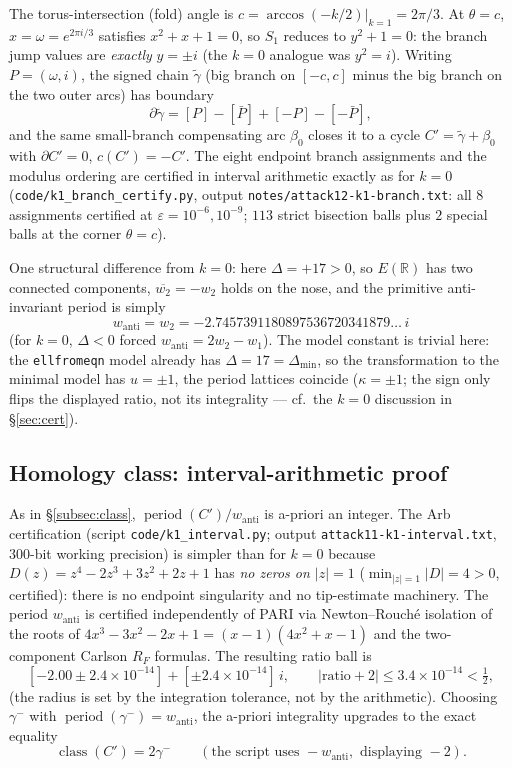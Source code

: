 \documentclass[preprint,12pt]{elsarticle}
\theoremstyle{definition}
\theoremstyle{remark}
\newcommand{\R}{\mathbb{R}}
\DeclareMathOperator{\period}{period}
\DeclareMathOperator{\class}{class}
\begin{document}
The torus-intersection (fold) angle is
$c=\arccos(-k/2)\big|_{k=1}=2\pi/3$. At $\theta=c$, $x=\omega=e^{2\pi i/3}$
satisfies $x^2+x+1=0$, so $S_1$ reduces to $y^2+1=0$: the branch jump values
are \emph{exactly} $y=\pm i$ (the $k=0$ analogue was $y^2=i$). Writing
$P=(\omega,i)$, the signed chain $\tilde\gamma$ (big branch on $[-c,c]$ minus
the big branch on the two outer arcs) has boundary
\[
  \partial\tilde\gamma=[P]-[\bar P]+[-P]-[-\bar P],
\]
and the same
small-branch compensating arc $\beta_0$ closes it to a cycle
$C'=\tilde\gamma+\beta_0$ with $\partial C'=0$, $c(C')=-C'$.
The eight endpoint branch assignments and the modulus ordering are certified
in interval arithmetic exactly as for $k=0$
(\texttt{code/k1\_branch\_certify.py}, output
\texttt{notes/attack12-k1-branch.txt}: all $8$ assignments certified at
$\varepsilon=10^{-6},10^{-9}$; $113$ strict bisection balls plus $2$ special
balls at the corner $\theta=c$).

One structural difference from $k=0$: here $\Delta=+17>0$, so $E(\R)$ has
two connected components, $\overline{w_2}=-w_2$ holds on the nose, and the
primitive anti-invariant period is simply
\[
  w_{\mathrm{anti}}=w_2=-2.7457391180897536720341879\ldots\,i
\]
(for $k=0$, $\Delta<0$ forced $w_{\mathrm{anti}}=2w_2-w_1$).
The model constant is trivial here: the \texttt{ellfromeqn} model already has
$\Delta=17=\Delta_{\min}$, so the transformation to the minimal model has
$u=\pm1$, the period lattices coincide ($\kappa=\pm1$; the sign only flips
the displayed ratio, not its integrality --- cf.\ the $k=0$ discussion in
\S\ref{sec:cert}).

\subsection{Homology class: interval-arithmetic proof}

As in \S\ref{subsec:class}, $\period(C')/w_{\mathrm{anti}}$ is a-priori an
integer. The Arb certification (script \texttt{code/k1\_interval.py};
output \texttt{attack11-k1-interval.txt}, $300$-bit working precision)
is simpler than for $k=0$ because
$D(z)=z^4-2z^3+3z^2+2z+1$ has \emph{no zeros on $|z|=1$}
($\min_{|z|=1}|D|=4>0$, certified): there is no endpoint singularity and no
tip-estimate machinery. The period $w_{\mathrm{anti}}$ is certified
independently of PARI via Newton--Rouch\'e isolation of the roots of
$4x^3-3x^2-2x+1=(x-1)(4x^2+x-1)$ and the two-component Carlson $R_F$
formulas. The resulting ratio ball is
\[
  [-2.00\pm2.4\times10^{-14}]+[\pm2.4\times10^{-14}]\,i,
  \qquad |\mathrm{ratio}+2|\le3.4\times10^{-14}<\tfrac12,
\]
(the radius is set by the integration tolerance, not by the arithmetic).
Choosing $\gamma^-$ with $\period(\gamma^-)=w_{\mathrm{anti}}$, the a-priori
integrality upgrades to the exact equality
\[
  \class(C')=2\gamma^-
  \qquad(\text{the script uses }-w_{\mathrm{anti}},\text{ displaying }-2).
\]
\end{document}
